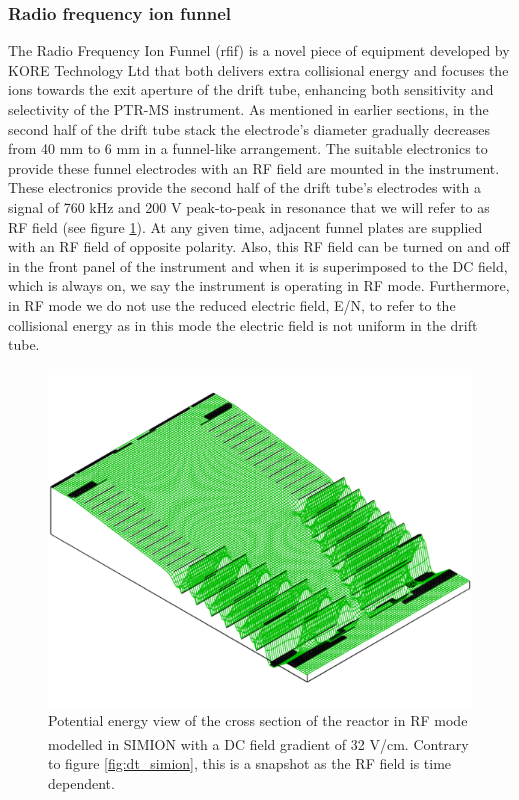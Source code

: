 \subsubsection{Radio frequency ion funnel}\label{section:rfif}
The Radio Frequency Ion Funnel (\acrshort{rfif}) is a novel piece of equipment developed by KORE Technology Ltd that both delivers extra collisional energy and focuses the ions towards the exit aperture of the drift tube, enhancing both sensitivity and selectivity of the PTR-MS instrument. As mentioned in earlier sections, in the second half of the drift tube stack the electrode's diameter gradually decreases from 40 mm to 6 mm in a funnel-like arrangement. The suitable electronics to provide these funnel electrodes with an RF field are mounted in the instrument. These electronics 
provide the second half of the drift tube's electrodes with a signal of 760 kHz and 200 V peak-to-peak in resonance that we will refer to as RF field (see figure \ref{fig:rfif_simion}). At any given time, adjacent funnel plates are supplied with an RF field of opposite polarity. Also, this RF field can be turned on and off in the front panel of the instrument and when it is superimposed to the DC field, which is always on, we say the instrument is operating in RF mode. Furthermore, in RF mode we do not use the reduced electric field, E/N, to refer to the collisional energy as in this mode the electric field is not uniform in the drift tube.

\begin{figure}%
\centering
\includegraphics[width=0.8\linewidth]{pics/RF_SIMION.PNG}
\caption{Potential energy view of the cross section of the reactor in RF mode modelled in SIMION\textsuperscript{\textregistered} with a DC field gradient of 32 V/cm. Contrary to figure \ref{fig:dt_simion}, this is a snapshot as the RF field is time dependent.}
\label{fig:rfif_simion}
\end{figure}

